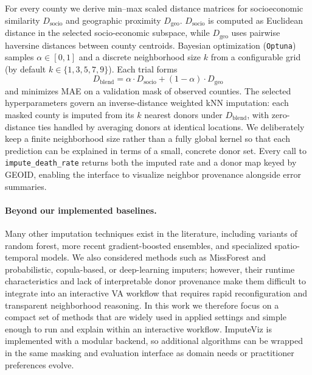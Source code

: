 \documentclass{egpubl}
\begin{document}
For every county we derive min--max scaled distance matrices for socioeconomic similarity \(D_{\text{socio}}\) and geographic proximity \(D_{\text{geo}}\). \(D_{\text{socio}}\) is computed as Euclidean distance in the selected socio-economic subspace, while \(D_{\text{geo}}\) uses pairwise haversine distances between county centroids. Bayesian optimization (\texttt{Optuna}) samples \(\alpha \in [0,1]\) and a discrete neighborhood size \(k\) from a configurable grid (by default \(k \in \{1,3,5,7,9\}\)). Each trial forms
\begin{equation}
  D_{\text{blend}} = \alpha \cdot D_{\text{socio}} + (1-\alpha) \cdot D_{\text{geo}}
\end{equation}
and minimizes MAE on a validation mask of observed counties. The selected hyperparameters govern an inverse-distance weighted kNN imputation: each masked county is imputed from its \(k\) nearest donors under \(D_{\text{blend}}\), with zero-distance ties handled by averaging donors at identical locations. We deliberately keep a finite neighborhood size rather than a fully global kernel so that each prediction can be explained in terms of a small, concrete donor set. Every call to \texttt{impute\_death\_rate} returns both the imputed rate and a donor map keyed by GEOID, enabling the interface to visualize neighbor provenance alongside error summaries.

\paragraph*{Beyond our implemented baselines.}
Many other imputation techniques exist in the literature, including variants of random forest, more recent gradient-boosted ensembles, and specialized spatio-temporal models. We also considered methods such as MissForest \cite{stekhoven2012missforest} and probabilistic, copula-based, or deep-learning imputers; however, their runtime characteristics and lack of interpretable donor provenance make them difficult to integrate into an interactive VA workflow that requires rapid reconfiguration and transparent neighborhood reasoning. In this work we therefore focus on a compact set of methods that are widely used in applied settings and simple enough to run and explain within an interactive workflow. ImputeViz is implemented with a modular backend, so additional algorithms can be wrapped in the same masking and evaluation interface as domain needs or practitioner preferences evolve.

\end{document}
